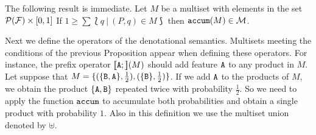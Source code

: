 The following result is immediate.
\bprop\label{prop:pr:accum}
 Let $M$ be a multiset with elements in the set ${\cal P}({\cal F})\times
 [0,1]$
 If $1\geq\sum\lbag q\ |\ (P,q)\in M\rbag$
 then $\mathtt{accum}(M)\in{\cal M}$.
\eprop


Next we define the operators of the denotational semantics. Multisets
meeting the conditions of the previous Proposition appear when
defining these operators. For instance, the prefix operator
$[\![{\mathtt{A}};]\!](M)$ should add feature ${\mathtt{A}}$ to any product in $M$. Let
suppose that 
$M=\{
   (\{{\mathtt{B}},{\mathtt{A}}\},\frac{1}{2}), 
   (\{{\mathtt{B}}\},\frac{1}{2})\}$. 
If we add ${\mathtt{A}}$ to the products of $M$, we obtain the product
$\{{\mathtt{A}},{\mathtt{B}}\}$ repeated twice with probability $\frac{1}{2}$. So we
need to apply the function $\mathtt{accum}$ to accumulate both probabilities
and obtain a single product with probability $1$. Also in this
definition we use the multiset union denoted by $\uplus$.


